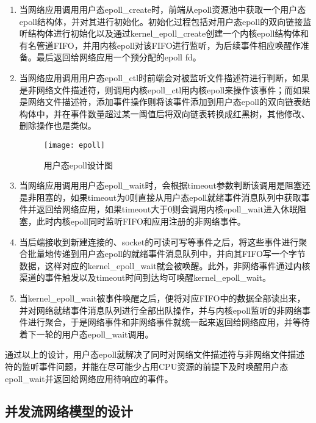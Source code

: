\begin{enumerate}[(1),labelsep=.5em, leftmargin = 0pt, itemindent = 3em]
\item 当网络应用调用用户态epoll\_create时，前端从epoll资源池中获取一个用户态epoll结构体，并对其进行初始化。初始化过程包括对用户态epoll的双向链接监听结构体进行初始化以及通过kernel\_epoll\_create创建一个内核epoll结构体和有名管道FIFO，并用内核epoll对该FIFO进行监听，为后续事件相应唤醒作准备。最后返回给网络应用一个预分配的epoll fd。
\item 当网络应用调用用户态epoll\_ctl时前端会对被监听文件描述符进行判断，如果是非网络文件描述符，则调用内核epoll\_ctl用内核epoll来操作该事件；而如果是网络文件描述符，添加事件操作则将该事件添加到用户态epoll的双向链表结构体中，并在事件数量超过某一阈值后将双向链表转换成红黑树，其他修改、删除操作也是类似。

\vspace{-10pt}
\begin{figure}[H] %
  \centering
  \texttt{[image: epoll]}
  \caption{用户态epoll设计图}
  \label{fig:epoll}
\end{figure}
\vspace{-10pt}

\item 当网络应用调用用户态epoll\_wait时，会根据timeout参数判断该调用是阻塞还是非阻塞的，如果timeout为0则直接从用户态epoll就绪事件消息队列中获取事件并返回给网络应用，如果timeout大于0则会调用内核epoll\_wait进入休眠阻塞，此时内核epoll同时监听FIFO和应用注册的非网络事件。
\item 当后端接收到新建连接的、socket的可读可写等事件之后，将这些事件进行聚合批量地传递到用户态epoll的就绪事件消息队列中，并向其FIFO写一个字节数据，这样对应的kernel\_epoll\_wait就会被唤醒。此外，非网络事件通过内核渠道的事件触发以及timeout时间到达均可唤醒kernel\_epoll\_wait。
\item 当kernel\_epoll\_wait被事件唤醒之后，便将对应FIFO中的数据全部读出来，并对网络就绪事件消息队列进行全部出队操作，并与内核epoll监听的非网络事件进行聚合，于是网络事件和非网络事件就统一起来返回给网络应用，并等待着下一轮的用户态epoll\_wait调用。
\end{enumerate}

通过以上的设计，用户态epoll就解决了同时对网络文件描述符与非网络文件描述符的监听事件问题，并能在尽可能少占用CPU资源的前提下及时唤醒用户态epoll\_wait并返回给网络应用待响应的事件。

\subsection{并发流网络模型的设计}

